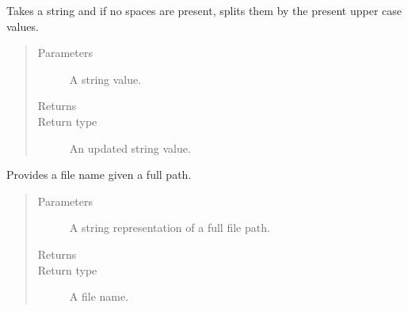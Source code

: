 \documentclass[letterpaper,10pt,english]{sphinxmanual}
\begin{document}

\begin{fulllineitems}
\label{\detokenize{index:ListManagement.utility.general.split_by_uppers}}
Takes a string and if no spaces are present, splits them by the present
upper case values.
\begin{quote}\begin{description}
\item[{Parameters}] \leavevmode
{} \textendash{} A string value.

\item[{Returns}] \leavevmode


\item[{Return type}] \leavevmode
An updated string value.

\end{description}\end{quote}

\end{fulllineitems}


\begin{fulllineitems}
\label{\detokenize{index:ListManagement.utility.general.split_dir_name}}
Provides a file name given a full path.
\begin{quote}\begin{description}
\item[{Parameters}] \leavevmode
{} \textendash{} A string representation of a full file path.

\item[{Returns}] \leavevmode


\item[{Return type}] \leavevmode
A file name.

\end{description}\end{quote}

\end{fulllineitems}

\end{document}
